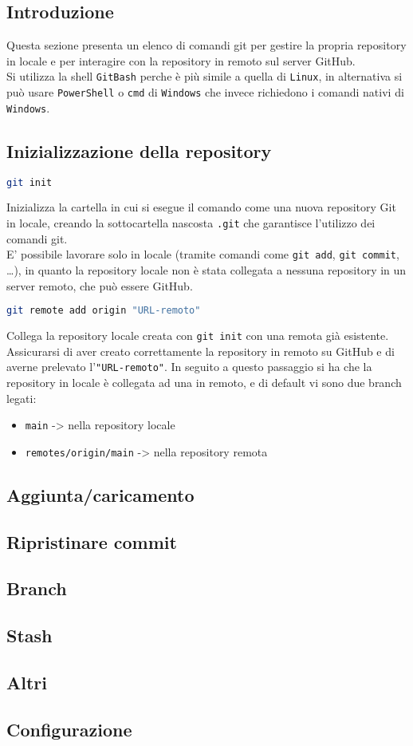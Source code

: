 \subsection*{Introduzione}
Questa sezione presenta un elenco di comandi git per gestire la propria repository in locale e per interagire con la repository in remoto sul server GitHub.\vspace{.3cm}\\
Si utilizza la shell \texttt{GitBash} perche è più simile a quella di \texttt{Linux}, in alternativa si può usare \texttt{PowerShell} o \texttt{cmd} di \texttt{Windows} che invece richiedono i comandi nativi di \texttt{Windows}.


\subsection{Inizializzazione della repository}
\begin{lstlisting}[language=bash]
	git init
\end{lstlisting}
Inizializza la cartella in cui si esegue il comando come una nuova repository Git in locale, creando la sottocartella nascosta \texttt{.git} che garantisce l'utilizzo dei comandi git.\\
E' possibile lavorare solo in locale (tramite comandi come \texttt{git add}, \texttt{git commit}, \dots), in quanto la repository locale non è stata collegata a nessuna repository in un server remoto, che può essere GitHub.\\

\begin{lstlisting}[language=bash]
	git remote add origin "URL-remoto"
\end{lstlisting}
Collega la repository locale creata con \texttt{git init} con una remota già esistente.\\ Assicurarsi di aver creato correttamente la repository in remoto su GitHub e di averne prelevato l'\texttt{\color{blue!70!black}"URL-remoto"}.
In seguito a questo passaggio si ha che la repository in locale è collegata ad una in remoto, e di default vi sono due branch legati:
\begin{itemize}[noitemsep, topsep=0pt]
	\item \texttt{main} -> nella repository locale
	\item \texttt{remotes/origin/main} -> nella repository remota
\end{itemize}


\subsection{Aggiunta/caricamento}
\subsection{Ripristinare commit}
\subsection{Branch}
\subsection{Stash}
\subsection{Altri}
\subsection{Configurazione}